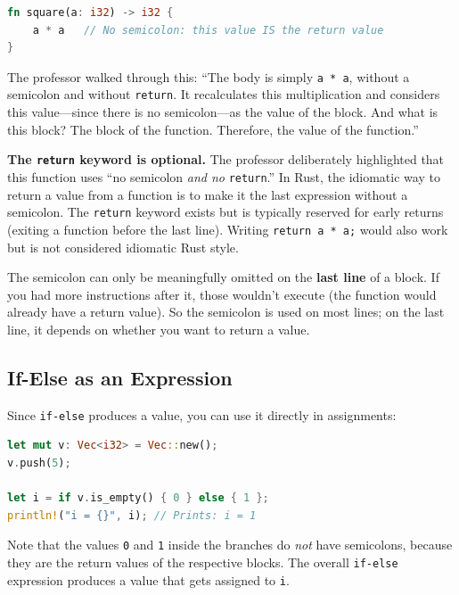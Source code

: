 \begin{lstlisting}[language=Rust]
fn square(a: i32) -> i32 {
    a * a   // No semicolon: this value IS the return value
}
\end{lstlisting}

The professor walked through this: ``The body is simply \texttt{a * a}, without a semicolon and without \texttt{return}. It recalculates this multiplication and considers this value---since there is no semicolon---as the value of the block. And what is this block? The block of the function. Therefore, the value of the function.''

\begin{insightbox}
\textbf{The \texttt{return} keyword is optional.} The professor deliberately highlighted that this function uses ``no semicolon \emph{and no} \texttt{return}.'' In Rust, the idiomatic way to return a value from a function is to make it the last expression without a semicolon. The \texttt{return} keyword exists but is typically reserved for early returns (exiting a function before the last line). Writing \texttt{return a * a;} would also work but is not considered idiomatic Rust style.
\end{insightbox}

\begin{warningbox}
The semicolon can only be meaningfully omitted on the \textbf{last line} of a block. If you had more instructions after it, those wouldn't execute (the function would already have a return value). So the semicolon is used on most lines; on the last line, it depends on whether you want to return a value.
\end{warningbox}

\subsection{If-Else as an Expression}

Since \texttt{if-else} produces a value, you can use it directly in assignments:

\begin{lstlisting}[language=Rust]
let mut v: Vec<i32> = Vec::new();
v.push(5);

let i = if v.is_empty() { 0 } else { 1 };
println!("i = {}", i); // Prints: i = 1
\end{lstlisting}

Note that the values \texttt{0} and \texttt{1} inside the branches do \emph{not} have semicolons, because they are the return values of the respective blocks. The overall \texttt{if-else} expression produces a value that gets assigned to \texttt{i}.

